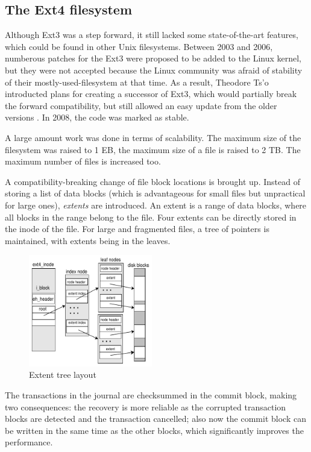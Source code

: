 \documentclass{acm_proc_article-sp}
\begin{document}
\subsection{The Ext4 filesystem}

Although Ext3 was a step forward, it still lacked some state-of-the-art features, which could be found in other Unix filesystems. Between 2003 and 2006, numberous patches for the Ext3 were proposed to be added to the Linux kernel, but they were not accepted because the Linux community was afraid of stability of their mostly-used-filesystem at that time. As a result, Theodore Ts'o introducted plans for creating a successor of Ext3, which would partially break the forward compatibility, but still allowed an easy update from the older versions \cite{newext4}. In 2008, the code was marked as stable.

A large amount work was done in terms of scalability. The maximum size of the filesystem was raised to 1 EB, the maximum size of a file is raised to 2 TB. The maximum number of files is increased too.

A compatibility-breaking change of file block locations is brought up. Instead of storing a list of data blocks (which is advantageous for small files but unpractical for large ones), {\it extents} are introduced. An extent is a range of data blocks, where all blocks in the range belong to the file. Four extents can be directly stored in the inode of the file. For large and fragmented files, a tree of pointers is maintained, with extents being in the leaves.

\begin{figure}
\centering
\includegraphics[width=0.48\textwidth]{images/extents.pdf}
	\caption{Extent tree layout \cite{newext4}}
\end{figure}

The transactions in the journal are checksummed in the commit block, making two consequences: the recovery is more reliable as the corrupted transaction blocks are detected and the transaction cancelled; also now the commit block can be written in the same time as the other blocks, which significantly improves the performance.
\end{document}
